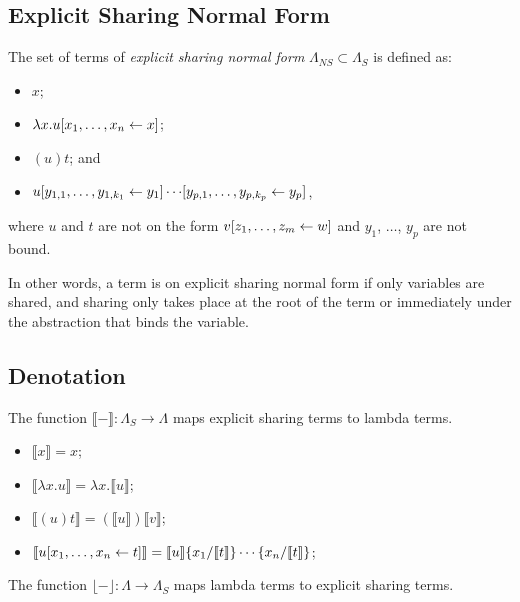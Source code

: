 \documentclass[10pt,a4paper]{article}
\theoremstyle{definition}
\theoremstyle{plain}
\theoremstyle{remark}
\begin{document}
\subsection{Explicit Sharing Normal Form}

The set of terms of \emph{explicit sharing normal form} $\Lambda_{NS}\subset\Lambda_S$ is defined as:

\begin{itemize}
	\item $x$;
	\item $\lambda x.{ { {u}[{{x_1},\dots,{x_n}}\leftarrow{x}] } }$;
	\item $(u)t$; and 
	\item ${ { {{ { {u}[{{y_{1,1}},\dots,{y_{1,k_1}}}\leftarrow{y_1}] } }\cdots}[{{y_{p,1}},\dots,{y_{p,k_p}}}\leftarrow{y_p}] } }$,
\end{itemize}
where $u$ and $t$ are not on the form ${ { {v}[{{z_1},\dots,{z_m}}\leftarrow{w}] } }$ and $y_1$, $\dots$, $y_p$ are not bound.

In other words, a term is on explicit sharing normal form if only variables are shared, and sharing only takes place at the root of the term or immediately under the abstraction that binds the variable.

\subsection{Denotation}

\newcommand{\terden}[1]{{\llbracket{#1}\rrbracket}}
\newcommand{\terpr}[2]{{\pi_{#1}({#2})}}

The function $\terden{-}:\Lambda_S\rightarrow\Lambda$ maps explicit sharing terms to lambda terms.

\begin{itemize}
	\item $\terden{x}=x$;
	\item $\terden{\lambda x.u}=\lambda x.\terden{u}$;
	\item $\terden{(u)t}=(\terden{u})\terden{v}$;
	\item $\terden{\tershare{u}{x_1}{x_n}{t}}=\tersubn{\terden{u}}{x_1}{\terden{t}}{x_n}{\terden{t}}$;
\end{itemize}

\newcommand{\tercoden}[1]{{\lfloor{#1}\rfloor}}

The function $\tercoden{-}:\Lambda\rightarrow\Lambda_S$ maps lambda terms to explicit sharing terms.
\end{document}
